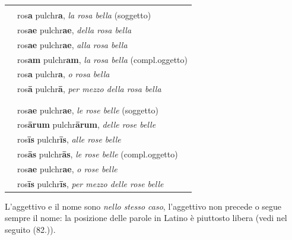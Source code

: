 \documentclass[nols]{tufte-handout}
\newcommand{\nom}{\textsc{nom}\xspace}
\newcommand{\gen}{\textsc{gen}\xspace}
\newcommand{\dat}{\textsc{dat}\xspace}
\newcommand{\acc}{\textsc{acc}\xspace}
\newcommand{\voc}{\textsc{voc}\xspace}
\newcommand{\abl}{\textsc{abl}\xspace}
\newcommand{\textls}[2][5]{%
    \begingroup\addfontfeatures{LetterSpace=#1}#2\endgroup
  }
\renewcommand{\smallcapsspacing}[1]{\textls[10]{#1}}
\renewcommand{\textsc}[1]{\smallcapsspacing{\textsmallcaps{#1}}}
\begin{document}
\begin{fullwidth}
\begin{table}[!htbp]
  \centering
  \begin{tabular}{l l}
	& \multicolumn{1}{c}{\textsc{Singolare}}\\

    \nom & ros\textbf{a} pulchr\textbf{a}, \textit{la rosa bella} (soggetto) \\
    \gen & ros\textbf{ae} pulchr\textbf{ae}, \textit{della rosa bella} \\
    \dat & ros\textbf{ae} pulchr\textbf{ae}, \textit{alla rosa bella}  \\
    \acc & ros\textbf{am} pulchr\textbf{am}, \textit{la rosa bella} (compl.oggetto) \\
    \voc & ros\textbf{a} pulchr\textbf{a}, \textit{o rosa bella} \\
    \abl & ros\textbf{ā} pulchr\textbf{ā}, \textit{per mezzo della rosa bella} \\
	
	\multicolumn{2}{c}{\textemdash} \\
	& \multicolumn{1}{c}{\textsc{Plurale}}\\

	\nom & ros\textbf{ae} pulchr\textbf{ae}, \textit{le rose belle} (soggetto)  \\
    \gen & ros\textbf{ārum} pulchr\textbf{ārum}, \textit{delle rose belle}   \\
    \dat & ros\textbf{īs} pulchr\textbf{īs}, \textit{alle rose belle} \\
    \acc & ros\textbf{ās} pulchr\textbf{ās}, \textit{le rose belle} (compl.oggetto)  \\
    \voc & ros\textbf{ae} pulchr\textbf{ae}, \textit{o rose belle}  \\
    \abl & ros\textbf{īs} pulchr\textbf{īs}, \textit{per mezzo delle rose belle} \\

  \end{tabular}
  \label{tab:normaltab}
\end{table}
\end{fullwidth}

 L'aggettivo e il nome sono \textit{nello stesso caso}, l'aggettivo non precede o segue sempre il nome: la posizione delle parole in Latino è piuttosto libera (vedi nel seguito (82.)).
\end{document}
